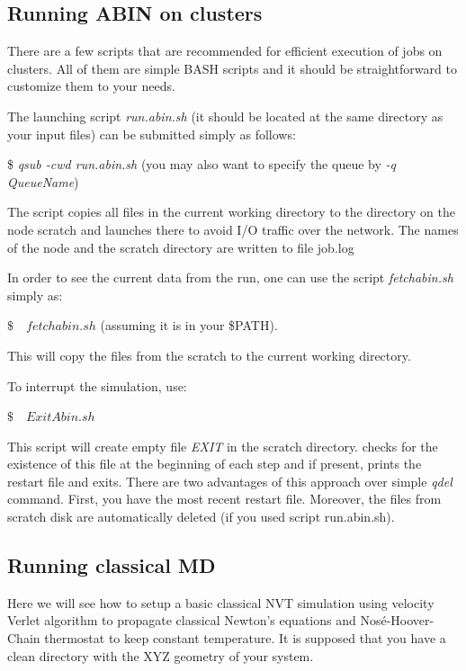 \subsection{Running ABIN on clusters}
\label{sec:clusters}
There are a few scripts that are recommended for efficient execution of \abin jobs on clusters. All of them are simple BASH scripts and it should be straightforward to customize them to your needs.

The launching script \textit{run.abin.sh} (it should be located at the same directory as your input files) can be submitted simply as follows:

\bigskip 

\colorbox{black!20}{\$  \textit{qsub -cwd run.abin.sh}} (you may also want to specify the queue by \textit{-q QueueName})

\bigskip \noindent 
The script copies all files in the current working directory to the directory on the node scratch and launches \abin there to avoid I/O traffic over the network.
The names of the node and the scratch directory are written to file job.log

In order to see the current data from the run, one can use the script \textit{fetchabin.sh} simply as:

\bigskip
\colorbox{black!20}{$ \$ \quad fetchabin.sh $} (assuming it is in your \textsc{\$PATH}).

\bigskip \noindent 
This will copy the files from the scratch to the current working directory.  

\noindent
To interrupt the simulation, use:

\colorbox{black!20}{$ \$ \quad ExitAbin.sh $}

\bigskip \noindent 
This script will create empty file \textit{EXIT} in the scratch directory. \abin checks for the existence of this file at the beginning of each step and if present, prints the restart file and exits. There are two advantages of this approach over simple \textit{qdel} command. First, you have the most recent restart file. Moreover, the files from scratch disk are automatically deleted (if you used script run.abin.sh).

\subsection{Running classical MD}

Here we will see how to setup a basic classical NVT simulation using velocity Verlet algorithm to propagate classical Newton's equations and Nos\'{e}-Hoover-Chain thermostat to keep constant temperature. 
It is supposed that you have a clean directory with the XYZ geometry of your system.

